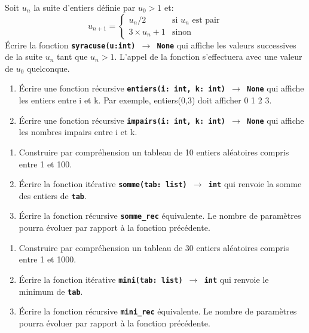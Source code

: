 \documentclass[a4paper,11pt]{article}
\begin{document}
\begin{exo}
    Soit $u_n$ la suite d'entiers définie par $u_0>1$ et:
    $$
        u_{n+1} = \left\{
        \begin{array}{ll}
            u_n/2   & \mbox{si  }u_n \mbox{ est pair} \\
            3×u_n+1 & \mbox{sinon}\
        \end{array}
        \right.
    $$
    Écrire la fonction \textbf{\texttt{syracuse(u:int) $\rightarrow$ None}} qui affiche les valeurs successives de la suite $u_n$ tant que $u_n>1$. L'appel de la fonction s'effectuera avec une valeur de $u_0$ quelconque.
\end{exo}
\begin{exo}
    \begin{enumerate}
        \item Écrire une fonction récursive \texttt{\textbf{entiers(i: int, k: int) $\rightarrow$ None}} qui affiche les entiers entre i et k. Par exemple, entiers(0,3) doit afficher 0 1 2 3.
        \item Écrire une fonction récursive \texttt{\textbf{impairs(i: int, k: int) $\rightarrow$ None}} qui affiche les nombres impairs entre i et k.
    \end{enumerate}
\end{exo}
\begin{exo}
\begin{enumerate}
    \item Construire par compréhension un tableau de 10 entiers aléatoires compris entre 1 et 100.
    \item Écrire la fonction itérative \textbf{\texttt{somme(tab: list) $\rightarrow$ int}} qui renvoie la somme des entiers de \textbf{\texttt{tab}}.
    \item Écrire la fonction récursive \textbf{\texttt{somme\_rec}} équivalente. Le nombre de paramètres pourra évoluer par rapport à la fonction précédente.
\end{enumerate}
\end{exo}
\begin{exo}
\begin{enumerate}
    \item Construire par compréhension un tableau de 30 entiers aléatoires compris entre 1 et 1000.
    \item Écrire la fonction itérative \textbf{\texttt{mini(tab: list) $\rightarrow$ int}} qui renvoie le minimum de \textbf{\texttt{tab}}.
    \item Écrire la fonction récursive \textbf{\texttt{mini\_rec}} équivalente. Le nombre de paramètres pourra évoluer par rapport à la fonction précédente.
\end{enumerate}
\end{exo}
\end{document}
